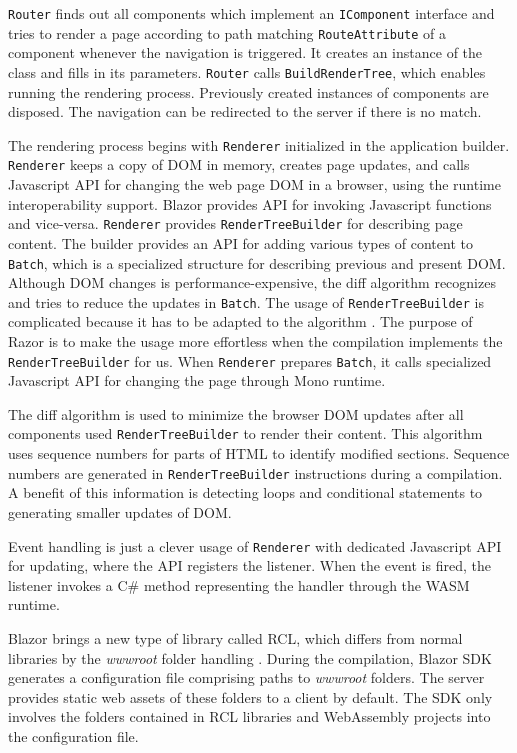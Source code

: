 \texttt{Router} finds out all components which implement an \texttt{IComponent} interface and tries to render a page according to path matching \texttt{RouteAttribute} of a component whenever the navigation is triggered.
It creates an instance of the class and fills in its parameters.
\texttt{Router} calls \texttt{BuildRenderTree}, which enables running the rendering process.
Previously created instances of components are disposed.
The navigation can be redirected to the server if there is no match.
\par
The rendering process begins with \texttt{Renderer} initialized in the application builder.
\texttt{Renderer} keeps a copy of DOM in memory, creates page updates, and calls Javascript API for changing the web page DOM in a browser, using the runtime interoperability support.
Blazor provides API for invoking Javascript functions and vice-versa.
\texttt{Renderer} provides \texttt{RenderTreeBuilder} for describing page content.
The builder provides an API for adding various types of content to \texttt{Batch}, which is a specialized structure for describing previous and present DOM.
Although DOM changes is performance-expensive, the diff algorithm \cite{online:diffAlgorithm} recognizes and tries to reduce the updates in \texttt{Batch}.
The usage of \texttt{RenderTreeBuilder} is complicated because it has to be adapted to the algorithm \cite{online:renderTree}.
The purpose of Razor is to make the usage more effortless when the compilation implements the \texttt{RenderTreeBuilder} for us.
When \texttt{Renderer} prepares \texttt{Batch}, it calls specialized Javascript API for changing the page through Mono runtime.
\par
The diff algorithm is used to minimize the browser DOM  updates after all components used \texttt{RenderTreeBuilder} to render their content.
This algorithm uses sequence numbers for parts of HTML to identify modified sections.
Sequence numbers are generated in \texttt{RenderTreeBuilder} instructions during a compilation.
A benefit of this information is detecting loops and conditional statements to generating smaller updates of DOM.  
\par
Event handling is just a clever usage of \texttt{Renderer} with dedicated Javascript API for updating, where the API registers the listener.
When the event is fired, the listener invokes a C\# method representing the handler through the WASM runtime.
\par
Blazor brings a new type of library called \ac{RCL}, which differs from normal libraries by the \textit{wwwroot} folder handling \cite{online:rcl}.
During the compilation, Blazor \ac{SDK} generates a configuration file comprising paths to \textit{wwwroot} folders.
The server provides static web assets of these folders to a client by default.
The SDK only involves the folders contained in RCL libraries and WebAssembly projects into the configuration file.

